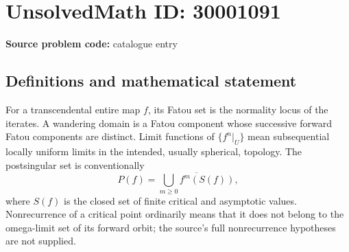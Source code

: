 \documentclass[11pt]{article}
\begin{document}
\section*{UnsolvedMath ID: 30001091}
\textbf{Source problem code:} catalogue entry
\subsection{Definitions and mathematical statement}
For a transcendental entire map \(f\), its Fatou set is the normality locus of the iterates. A wandering domain is a Fatou component whose successive forward Fatou components are distinct. Limit functions of \(\{f^n|_U\}\) mean subsequential locally uniform limits in the intended, usually spherical, topology. The postsingular set is conventionally
\[
P(f)=\overline{\bigcup_{m\geq0}f^m(S(f))},
\]
where \(S(f)\) is the closed set of finite critical and asymptotic values. Nonrecurrence of a critical point ordinarily means that it does not belong to the omega-limit set of its forward orbit; the source's full nonrecurrence hypotheses are not supplied.
\end{document}
